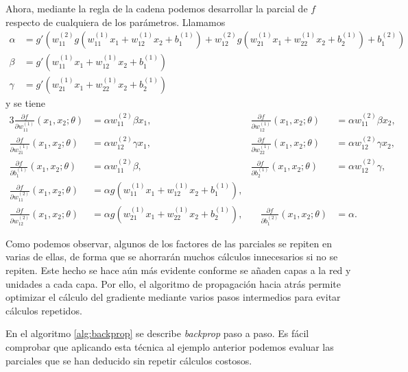 \begin{example}
Ahora, mediante la regla de la cadena podemos desarrollar la parcial de $f$ respecto de cualquiera de los parámetros. Llamamos
\footnotesize
\begin{align*}
  \alpha&=g'\left(w_{11}^{(2)} g\left(w_{11}^{(1)}x_{1}+w_{12}^{(1)}x_2+b_1^{(1)}\right) + w_{12}^{(2)} g\left(w_{21}^{(1)}x_1+w_{22}^{(1)}x_2+b_2^{(1)}\right)+b_1^{(2)}\right)\\
  \beta&=g'\left(w_{11}^{(1)}x_{1}+w_{12}^{(1)}x_2+b_1^{(1)}\right)\\
  \gamma&=g'\left(w_{21}^{(1)}x_{1}+w_{22}^{(1)}x_2+b_2^{(1)}\right)
\end{align*}
\normalsize
y se tiene
\footnotesize
\begin{alignat*}{3}
  \frac{\partial f}{\partial w_{11}^{(1)}}(x_1,x_2;\theta)&=\alpha w_{11}^{(2)}\beta x_1,\quad&
  \frac{\partial f}{\partial w_{12}^{(1)}}(x_1,x_2;\theta)&=\alpha w_{11}^{(2)}\beta x_2,\\
  \frac{\partial f}{\partial w_{21}^{(1)}}(x_1,x_2;\theta)&=\alpha w_{12}^{(2)}\gamma x_1,\quad&
  \frac{\partial f}{\partial w_{22}^{(1)}}(x_1,x_2;\theta)&=\alpha w_{12}^{(2)}\gamma x_2,\\
  \frac{\partial f}{\partial b_{1}^{(1)}}(x_1,x_2;\theta)&=\alpha w_{11}^{(2)}\beta, \quad&
  \frac{\partial f}{\partial b_{2}^{(1)}}(x_1,x_2;\theta)&=\alpha w_{12}^{(2)}\gamma, \\
  \frac{\partial f}{\partial w_{11}^{(2)}}(x_1,x_2;\theta)&=\alpha g(w_{11}^{(1)}x_{1}+w_{12}^{(1)}x_2 + b_1^{(1)}),&&\\
  \frac{\partial f}{\partial w_{12}^{(2)}}(x_1,x_2;\theta)&=\alpha g(w_{21}^{(1)}x_{1}+w_{22}^{(1)}x_2 + b_2^{(1)}),&\quad
  \frac{\partial f}{\partial b_{1}^{(2)}}(x_1,x_2;\theta)&=\alpha.
\end{alignat*}
\normalsize

Como podemos observar, algunos de los factores de las parciales se repiten en varias de ellas, de forma que se ahorrarán muchos cálculos innecesarios si no se repiten. Este hecho se hace aún más evidente conforme se añaden capas a la red y unidades a cada capa. Por ello, el algoritmo de propagación hacia atrás permite optimizar el cálculo del gradiente mediante varios pasos intermedios para evitar cálculos repetidos.

\end{example}

En el algoritmo \ref{alg:backprop} se describe \emph{backprop} paso a
paso. Es fácil comprobar que aplicando esta técnica al ejemplo anterior
podemos evaluar las parciales que se han deducido sin repetir cálculos
costosos.

